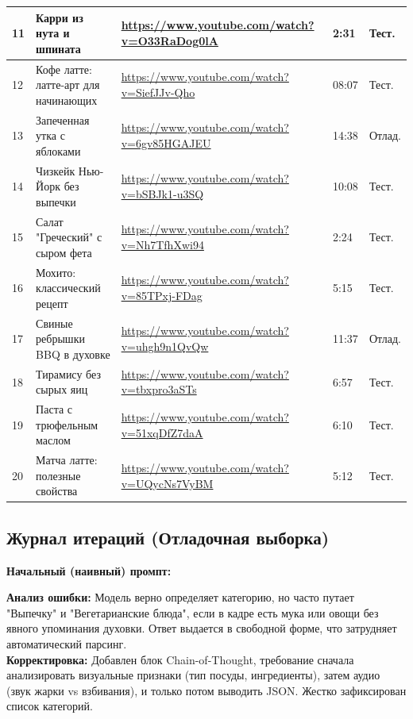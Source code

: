 \documentclass[oneside,a4paper,14pt]{extarticle} %
\begin{document}
		\begin{table}[H]
			\centering
			\begin{tabularx}{\textwidth}{|p{0.4cm}|p{5.5cm}|p{5cm}|p{1.5cm}|p{1cm}|}
				11 & Карри из нута и шпината & \url{https://www.youtube.com/watch?v=O33RaDog0lA} & 2:31 & Тест. \\ \hline
				12 & Кофе латте: латте-арт для начинающих & \url{https://www.youtube.com/watch?v=SiefJJv-Qho} & 08:07 & Тест. \\ \hline
				13 & Запеченная утка с яблоками & \url{https://www.youtube.com/watch?v=6gv85HGAJEU} & 14:38 & Отлад. \\ \hline
				14 & Чизкейк Нью-Йорк без выпечки & \url{https://www.youtube.com/watch?v=bSBJk1-u3SQ} & 10:08 & Тест. \\ \hline
				15 & Салат "Греческий" с сыром фета & \url{https://www.youtube.com/watch?v=Nh7TfhXwi94} & 2:24 & Тест. \\ \hline
				16 & Мохито: классический рецепт & \url{https://www.youtube.com/watch?v=85TPxj-FDag} & 5:15 & Тест. \\ \hline
				17 & Свиные ребрышки BBQ в духовке & \url{https://www.youtube.com/watch?v=uhgh9n1QvQw} & 11:37 & Отлад. \\ \hline
				18 & Тирамису без сырых яиц & \url{https://www.youtube.com/watch?v=tbxpro3aSTs} & 6:57 & Тест. \\ \hline
				19 & Паста с трюфельным маслом & \url{https://www.youtube.com/watch?v=51xqDfZ7daA} & 6:10 & Тест. \\ \hline
				20 & Матча латте: полезные свойства & \url{https://www.youtube.com/watch?v=UQycNs7VyBM} & 5:12 & Тест. \\ \hline
			\end{tabularx}
		\end{table}
		
		\subsection{Журнал итераций (Отладочная выборка)}
		\noindent
		\textbf{Начальный (наивный) промпт:}
		
		\noindent
		\textbf{Анализ ошибки:} Модель верно определяет категорию, но часто путает "Выпечку" и "Вегетарианские блюда", если в кадре есть мука или овощи без явного упоминания духовки. Ответ выдается в свободной форме, что затрудняет автоматический парсинг.\\
		\textbf{Корректировка:} Добавлен блок Chain-of-Thought, требование сначала анализировать визуальные признаки (тип посуды, ингредиенты), затем аудио (звук жарки vs взбивания), и только потом выводить JSON. Жестко зафиксирован список категорий.
		
\end{document}

